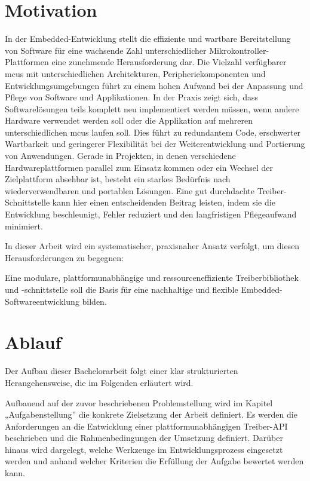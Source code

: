 \section{Motivation}
In der Embedded-Entwicklung stellt die effiziente und wartbare Bereitstellung von Software für eine wachsende Zahl unterschiedlicher Mikrokontroller-Plattformen eine zunehmende Herausforderung dar.
Die Vielzahl verfügbarer \gls{mcu}s %
 mit unterschiedlichen Architekturen, Peripheriekomponenten und Entwicklungsumgebungen führt zu einem hohen Aufwand bei der Anpassung und Pflege von Software und Applikationen.
In der Praxis zeigt sich, dass Softwarelösungen teils komplett neu implementiert werden müssen, wenn andere Hardware verwendet werden soll oder die Applikation auf mehreren unterschiedlichen \gls{mcu}s laufen soll.
Dies führt zu redundantem Code, erschwerter Wartbarkeit und geringerer Flexibilität bei der Weiterentwicklung und Portierung von Anwendungen.
Gerade in Projekten, in denen verschiedene Hardwareplattformen parallel zum Einsatz kommen oder ein Wechsel der Zielplattform absehbar ist, besteht ein starkes Bedürfnis nach wiederverwendbaren und portablen Lösungen. Eine gut durchdachte Treiber-Schnittstelle kann hier einen entscheidenden Beitrag leisten, indem sie 
die Entwicklung beschleunigt, Fehler reduziert und den langfristigen Pflegeaufwand minimiert. 
 
In dieser Arbeit wird ein systematischer, praxisnaher Ansatz verfolgt, um diesen Herausforderungen zu begegnen:

Eine modulare, plattformunabhängige und ressourceneffiziente Treiberbibliothek und -schnittstelle soll die Basis für eine nachhaltige und flexible Embedded-Softwareentwicklung bilden. 


\section{Ablauf}
Der Aufbau dieser Bachelorarbeit folgt einer klar strukturierten Herangehensweise, die im Folgenden erläutert wird. 

Aufbauend auf der zuvor beschriebenen Problemstellung wird im Kapitel „Aufgabenstellung” die konkrete Zielsetzung der Arbeit definiert.
Es werden die Anforderungen an die Entwicklung einer plattformunabhängigen Treiber-API beschrieben und die Rahmenbedingungen der Umsetzung definiert.
Darüber hinaus wird dargelegt, welche Werkzeuge im Entwicklungsprozess eingesetzt werden und anhand welcher Kriterien die Erfüllung der Aufgabe bewertet werden kann.

